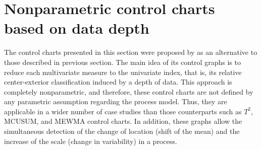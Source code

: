 

\section{Nonparametric control charts based on data depth}    

The control charts presented in this section were proposed by \cite{liu1995control} as an alternative to those described in previous section. 
The main idea of its control graphs is to reduce each multivariate measure to the univariate index, that is, its relative center-exterior classification induced by a depth of data.  
This approach is completely nonparametric, and therefore, these control charts are not defined by any parametric assumption regarding the process model.  
Thus, they are applicable in a wider number of case studies than those counterparts such as  $T^2$, MCUSUM, and MEWMA control charts. In addition, these graphs allow the simultaneous detection of the change of location (shift of the mean) and the increase of the scale (change in variability) in a process.

